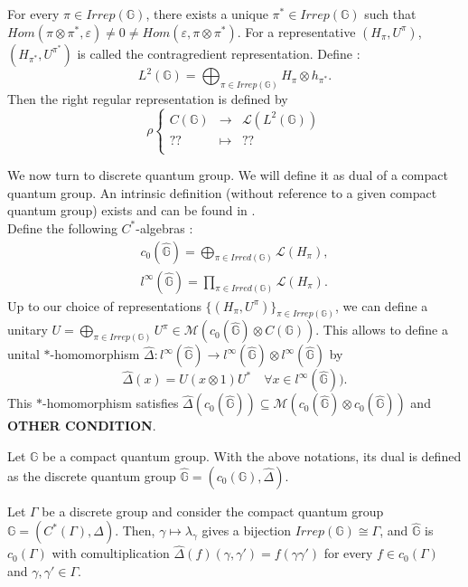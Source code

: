 For every $\pi\in Irrep(\mathbb G)$, there exists a unique $\pi^*\in Irrep(\mathbb G)$ such that $Hom(\pi\otimes \pi^*,\varepsilon)\neq 0 \neq Hom(\varepsilon,\pi\otimes \pi^*) $. For a representative $(H_\pi,U^\pi)$, $(H_{\pi^*},U^{\pi^*})$ is called the contragredient representation. Define :
\[L^2(\mathbb G) = \bigoplus_{\pi\in Irrep(\mathbb G)} H_\pi \otimes h_{\pi^*}. \]
Then the right regular representation is defined by
\[\rho\left\{\begin{array}{rcl}
C(\mathbb G) & \rightarrow & \mathcal L(L^2(\mathbb G)) \\
??	& \mapsto & ??\\
\end{array}\right.\]

We now turn to discrete quantum group. We will define it as dual of a compact quantum group. An intrinsic definition (without reference to a given compact quantum group) exists and can be found in \cite{vandaele}.\\

Define the following $C^*$-algebras :
\[\begin{array}{c}
c_0(\hat{\mathbb G})= \bigoplus_{\pi\in Irred(\mathbb G)} \mathcal L(H_\pi),\\
l^\infty(\hat{\mathbb G})= \prod_{\pi\in Irred(\mathbb G)} \mathcal L(H_\pi).
\end{array}\]
Up to our choice of representations $\{(H_\pi,U^\pi)\}_{\pi\in Irrep(\mathbb G)}$, we can define a unitary $U = \bigoplus_{\pi\in Irrep(\mathbb G)} U^\pi\in \mathcal M(c_0(\hat{\mathbb G}) \otimes C(\mathbb G))$. This allows to define a unital $*$-homomorphism $\hat \Delta : l^\infty(\hat{\mathbb G}) \rightarrow l^\infty(\hat{\mathbb G})\otimes l^\infty(\hat{\mathbb G})$ by 
\[\hat\Delta ( x) = U(x \otimes 1)U^*\quad \forall x\in l^\infty(\hat{\mathbb G})).\]
This $*$-homomorphism satisfies $\hat\Delta(c_0(\hat{\mathbb G}))\subseteq \mathcal M(c_0(\hat{\mathbb G})\otimes c_0(\hat{\mathbb G}))$ and \textbf{OTHER CONDITION}.
\begin{definition}
Let $\mathbb G$ be a compact quantum group. With the above notations, its dual is defined as the discrete quantum group $\hat{\mathbb G} = (c_0(\mathbb G),\hat\Delta)$.
\end{definition}

\begin{Expl} Let $\Gamma$ be a discrete group and consider the compact quantum group $\mathbb G=(C^*(\Gamma),\Delta)$. Then, $\gamma\mapsto \lambda_\gamma$ gives a bijection $Irrep(\mathbb G)\cong \Gamma$, and $\hat{\mathbb G}$ is $c_0(\Gamma)$ with comultiplication $\hat\Delta (f)(\gamma,\gamma') = f(\gamma\gamma')$ for every $f\in c_0(\Gamma)$ and $\gamma,\gamma'\in\Gamma$.
\end{Expl}

